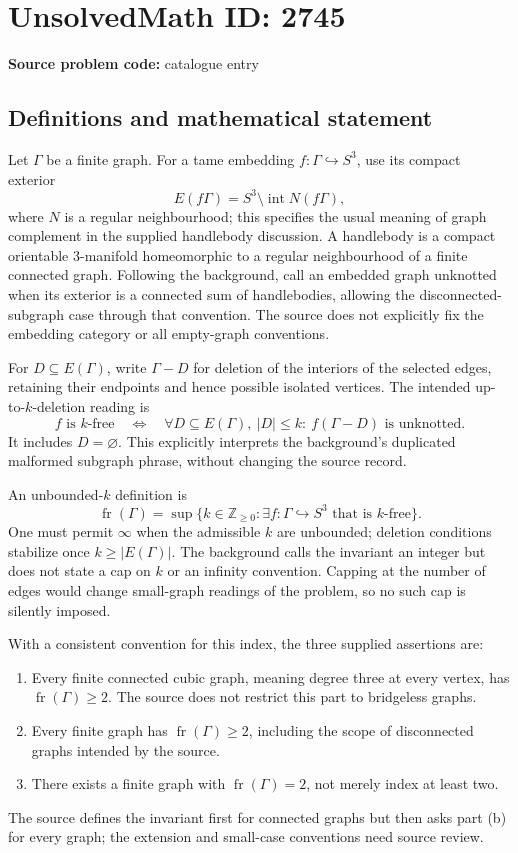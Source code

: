 \documentclass[11pt]{article}
\newcommand{\Z}{\mathbb{Z}}
\begin{document}
\section*{UnsolvedMath ID: 2745}
\textbf{Source problem code:} catalogue entry
\subsection{Definitions and mathematical statement}
Let \(\Gamma\) be a finite graph. For a tame embedding \(f:\Gamma\hookrightarrow S^3\), use its compact exterior
\[
E(f\Gamma)=S^3\setminus\operatorname{int}N(f\Gamma),
\]
where \(N\) is a regular neighbourhood; this specifies the usual meaning of graph complement in the supplied handlebody discussion. A handlebody is a compact orientable 3-manifold homeomorphic to a regular neighbourhood of a finite connected graph. Following the background, call an embedded graph unknotted when its exterior is a connected sum of handlebodies, allowing the disconnected-subgraph case through that convention. The source does not explicitly fix the embedding category or all empty-graph conventions.

For \(D\subseteq E(\Gamma)\), write \(\Gamma-D\) for deletion of the interiors of the selected edges, retaining their endpoints and hence possible isolated vertices. The intended up-to-\(k\)-deletion reading is
\[
f\text{ is }k\text{-free}\quad\Longleftrightarrow\quad
\forall D\subseteq E(\Gamma),\ |D|\leq k:\
f(\Gamma-D)\text{ is unknotted}.
\]
It includes \(D=\varnothing\). This explicitly interprets the background's duplicated malformed subgraph phrase, without changing the source record.

An unbounded-\(k\) definition is
\[
\operatorname{fr}(\Gamma)=\sup\{k\in\Z_{\geq0}:\exists f:\Gamma\hookrightarrow S^3\text{ that is }k\text{-free}\}.
\]
One must permit \(\infty\) when the admissible \(k\) are unbounded; deletion conditions stabilize once \(k\geq|E(\Gamma)|\). The background calls the invariant an integer but does not state a cap on \(k\) or an infinity convention. Capping at the number of edges would change small-graph readings of the problem, so no such cap is silently imposed.

With a consistent convention for this index, the three supplied assertions are:
\begin{enumerate}
\item Every finite connected cubic graph, meaning degree three at every vertex, has \(\operatorname{fr}(\Gamma)\geq2\). The source does not restrict this part to bridgeless graphs.
\item Every finite graph has \(\operatorname{fr}(\Gamma)\geq2\), including the scope of disconnected graphs intended by the source.
\item There exists a finite graph with \(\operatorname{fr}(\Gamma)=2\), not merely index at least two.
\end{enumerate}
The source defines the invariant first for connected graphs but then asks part (b) for every graph; the extension and small-case conventions need source review.
\end{document}
